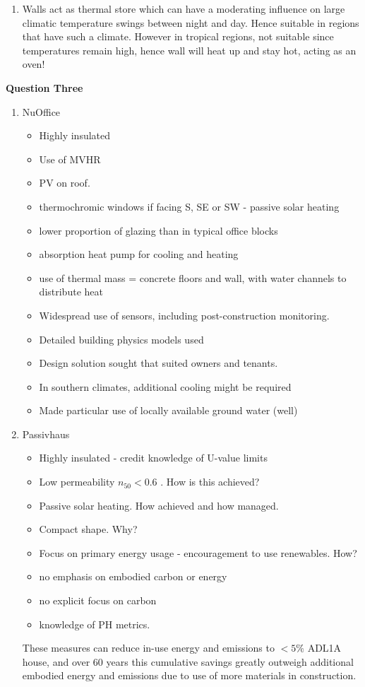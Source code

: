 \documentclass[a4paper,12pt,fleqn]{article}
\begin{document}
\begin{enumerate}[label=\alph*)]
\item Walls act as thermal store which can have a moderating influence on large climatic temperature swings between night and day. Hence suitable in regions that have such a climate. However in tropical regions, not suitable since temperatures remain high, hence wall will heat up and stay hot, acting as an oven!
\end{enumerate}

\textbf{Question Three}
\begin{enumerate}[label=\alph*)]
\item NuOffice
    \begin{itemize}
        \item Highly insulated
        \item Use of MVHR
        \item PV on roof.
        \item thermochromic windows if facing S, SE or SW - passive solar heating
        \item lower proportion of glazing than in typical office blocks
        \item absorption heat pump for cooling and heating
        \item use of thermal mass = concrete floors and wall, with water channels to distribute heat
        \item Widespread use of sensors, including post-construction monitoring.
        \item Detailed building physics models used
        \item Design solution sought that suited owners and tenants.
        \item In southern climates, additional cooling might be required
        \item Made particular use of locally available ground water (well)
    \end{itemize}
\item Passivhaus
    \begin{itemize}
        \item Highly insulated - credit knowledge of U-value limits
        \item Low permeability $n_{50}< 0.6$ . How is this achieved?
        \item Passive solar heating. How achieved and how managed.
        \item Compact shape. Why?
        \item Focus on primary energy usage - encouragement to use renewables. How?
        \item no emphasis on embodied carbon or energy
        \item no explicit focus on carbon
        \item knowledge of PH metrics.
    \end{itemize}
    These measures can reduce in-use energy and emissions to $< 5\%$ ADL1A house, and over 60 years this cumulative savings greatly outweigh additional embodied energy and emissions due to use of more materials in construction.
\end{enumerate}
\end{document}
